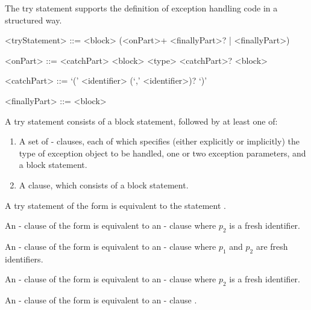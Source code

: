 \documentclass[makeidx]{article}
\begin{document}
{\LMHash{}%
The try statement supports the definition of exception handling code in a structured way.

\begin{grammar}
<tryStatement> ::= \TRY{} <block> (<onPart>+ <finallyPart>? | <finallyPart>)

<onPart> ::= <catchPart> <block>
  \alt \ON{} <type> <catchPart>? <block>

<catchPart> ::= \CATCH{} `(' <identifier> (`,' <identifier>)? `)'

<finallyPart> ::= \FINALLY{} <block>
\end{grammar}

\LMHash{}%
A try statement consists of a block statement, followed by at least one of:
\begin{enumerate}
\item
A set of \ON{}-\CATCH{} clauses, each of which specifies (either explicitly or implicitly) the type of exception object to be handled, one or two exception parameters, and a block statement.
\item
A \FINALLY{} clause, which consists of a block statement.
\end{enumerate}


\LMHash{}%
A try statement of the form  is equivalent to the statement .

\LMHash{}%
An \ON{}-\CATCH{} clause of the form  is equivalent to an \ON{}-\CATCH{} clause  where $p_2$ is a fresh identifier.

\LMHash{}%
An \ON{}-\CATCH{} clause of the form  is equivalent to an \ON{}-\CATCH{} clause  where $p_1$ and $p_2$ are fresh identifiers.

\LMHash{}%
An \ON{}-\CATCH{} clause of the form  is equivalent to an \ON{}-\CATCH{} clause  where $p_2$ is a fresh identifier.

An \ON{}-\CATCH{} clause of the form  is equivalent to an \ON{}-\CATCH{} clause .

}
\end{document}
